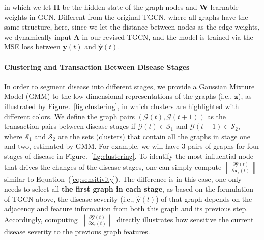 \documentclass{article} %
\begin{document}
in which we let $\mathbf H$ be the hidden state of the graph nodes and $\mathbf W$ learnable weights in GCN. Different from the original TGCN, where all graphs have the same structure, here, since we let the distance between nodes as the edge weights, we dynamically input $\mathbf A$ in our revised TGCN, and the model is trained via the MSE loss between $\mathbf y(t)$ and $\widehat{\mathbf y}(t)$. 





\paragraph{Clustering and Transaction Between Disease Stages}
In order to segment disease into different stages, we provide a Gaussian Mixture Model (GMM) to the low-dimensional representations of the graphs (i.e., $\mathbf z$), as illustrated by Figure.~\ref{fig:clustering}, in which clusters are highlighted with different colors. We define the graph pairs $(\mathcal G(t), \mathcal G(t+1))$ as the transaction pairs between disease stages if $\mathcal G(t) \in \mathcal S_1$ and $\mathcal G(t+1) \in \mathcal S_2$, where $\mathcal S_1$ and $\mathcal S_2$ are the sets (clusters) that contain all the graphs in stage one and two, estimated by GMM. For example, we will have 3 pairs of graphs for four stages of disease in Figure.~\ref{fig:clustering}. To identify the most influential node that drives the changes of the disease stages, one can simply compute $\left \|\frac{\partial \widehat{\mathbf y}(t)}{\partial \mathbf x_s(t)}\right \|$ similar to Equation~(\ref{eq:sensitivity}). The difference is in this case, one only needs to select all \textbf{the first graph in each stage}, as based on the formulation of TGCN above, the disease severity (i.e., $\widehat{\mathbf y}(t)$) of that graph depends on the adjacency and feature information from both this graph and its previous step. Accordingly, computing $\left \|\frac{\partial \widehat{\mathbf y}(t)}{\partial \mathbf x_s(t)}\right \|$ directly illustrates how sensitive the current disease severity to the previous graph features. 
\end{document}
